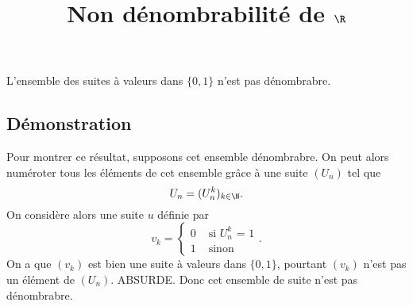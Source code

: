 \documentclass[fontsize=12pt,twoside=false,parskip=half]{scrartcl}
\title{Non dénombrabilité de $\R$}
\date{}
\author{}
\begin{document}
\maketitle
   \begin{Theoreme}
      L’ensemble des suites à valeurs dans $\{0, 1\}$ n’est pas dénombrabre.
   \end{Theoreme}
   \subsection{Démonstration}
      Pour montrer ce résultat, supposons cet ensemble dénombrabre. On peut alors
      numéroter tous les éléments de cet ensemble grâce à une suite $(U_n)$ tel que
      \[
         U_n = (U_n^k)_{k \in \N}.
      \]
      On considère alors une suite $u$ définie par
      \[
         v_k =
         \begin{cases}
            0 & \text{ si $U_n^k$ = 1} \\
            1 & \text{ sinon}
         \end{cases}.
      \]
      On a que $(v_k)$ est bien une suite à valeurs dans $\{0, 1\}$, pourtant $(v_k)$ 
      n’est pas un élément de $(U_n)$. ABSURDE. Donc cet ensemble de suite n’est pas 
      dénombrabre.
\end{document}
